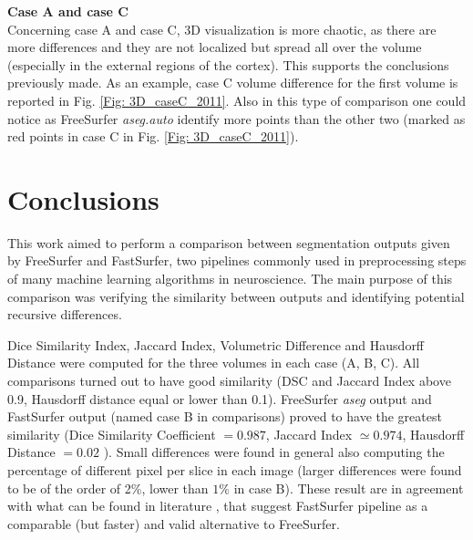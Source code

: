 \documentclass{article}
\begin{document}
	\textbf{Case A and case C}
	\\
	Concerning case A and case C, 3D visualization is more chaotic, as there are more differences and they are not localized but spread all over the volume (especially in the external regions of the cortex). This supports the conclusions previously made.
	As an example, case C volume difference for the first volume is reported in Fig. \ref{Fig: 3D_caseC_2011}.
	Also in this type of comparison one could notice as FreeSurfer \textsl{aseg.auto} identify more points than the other two (marked as red points in case C in Fig. \ref{Fig: 3D_caseC_2011}).
		
	
	
	










	\newpage
	\section{Conclusions}
	
	This work aimed to perform a comparison between segmentation outputs given by FreeSurfer and FastSurfer, two pipelines commonly used in preprocessing steps of many machine learning algorithms in neuroscience. The main purpose of this comparison was verifying the similarity between outputs and identifying potential recursive differences.

	Dice Similarity Index, Jaccard Index, Volumetric Difference and Hausdorff Distance were computed for the three volumes in each case (A, B, C). All comparisons turned out to have good similarity (DSC and Jaccard Index above 0.9, Hausdorff distance equal or lower than 0.1). FreeSurfer \textsl{aseg} output and FastSurfer output (named case B in comparisons) proved to have the greatest similarity (Dice Similarity Coefficient $= 0.987$, Jaccard Index $\simeq 0.974$, Hausdorff Distance $= 0.02$ ). Small differences were found in general also computing the percentage of different pixel per slice in each image (larger differences were found to be of the order of 2$\%$, lower than $1\%$ in case B). These result are in agreement with what can be found in literature \cite{Henschel_FastSurfer}, \cite{Bloch_FastSurfer} that suggest FastSurfer pipeline as a comparable (but faster) and valid alternative to FreeSurfer. 
	
\end{document}
